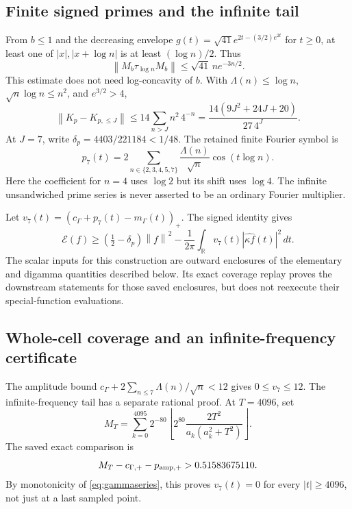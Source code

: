\documentclass[11pt,a4paper]{article}
\numberwithin{equation}{section}
\theoremstyle{definition}\newtheorem{definition}[theorem]{Definition}
\theoremstyle{remark}\newtheorem{remark}[theorem]{Remark}
\newcommand{\EE}{\mathcal E}
\newcommand{\R}{\mathbb R}
\newcommand{\norm}[1]{\left\|#1\right\|}
\begin{document}
\subsection{Finite signed primes and the infinite tail}
From $b\le1$ and the decreasing envelope
$g(t)=\sqrt{41}e^{2t-(3/2)e^{2t}}$ for $t\ge0$, at least one of $|x|,|x+\log n|$ is at least $(\log n)/2$. Thus
\begin{equation}
 \norm{M_b\tau_{\log n}M_b}\le\sqrt{41}\,n e^{-3n/2}.
\end{equation}
This estimate does not need log-concavity of $b$. With $\Lambda(n)\le\log n$, $\sqrt n\log n\le n^2$, and $e^{3/2}>4$,
\begin{equation}\label{eq:primetail}
 \norm{K_p-K_{p,\le J}}\le14\sum_{n>J}n^2\,4^{-n}
 =\frac{14(9J^2+24J+20)}{27\,4^J}.
\end{equation}
At $J=7$, write $\delta_p=4403/221184<1/48$.
The retained finite Fourier symbol is
\begin{equation}\label{eq:p7}
 p_7(t)=2\sum_{n\in\{2,3,4,5,7\}}\frac{\Lambda(n)}{\sqrt n}\cos(t\log n).
\end{equation}
Here the coefficient for $n=4$ uses $\log2$ but its shift uses $\log4$. The infinite unsandwiched prime series is never asserted to be an ordinary Fourier multiplier.

Let $v_7(t)=(c_\Gamma+p_7(t)-m_\Gamma(t))_+$. The signed identity gives
\begin{equation}\label{eq:signedenergy}
 \EE(f)\ge(\tfrac12-\delta_p)\norm f^2
 -\frac1{2\pi}\int_{\R}v_7(t)|\widehat{\kappa f}(t)|^2\,dt.
\end{equation}
The scalar inputs for this construction are outward enclosures of the elementary and digamma quantities described below. Its exact coverage replay proves the downstream statements for those saved enclosures, but does not reexecute their special-function evaluations.

\subsection{Whole-cell coverage and an infinite-frequency certificate}
The amplitude bound $c_\Gamma+2\sum_{n\le7}\Lambda(n)/\sqrt n<12$ gives $0\le v_7\le12$. The infinite-frequency tail has a separate rational proof. At $T=4096$, set
\begin{equation}
 M_T=\sum_{k=0}^{4095}2^{-80}\left\lfloor
 2^{80}\frac{2T^2}{a_k(a_k^2+T^2)}\right\rfloor.
\end{equation}
The saved exact comparison is
\begin{equation}
 M_T-c_{\Gamma,+}-p_{{\rm amp},+}>0.51583675110.
\end{equation}
By monotonicity of \eqref{eq:gammaseries}, this proves $v_7(t)=0$ for every $|t|\ge4096$, not just at a last sampled point.
\end{document}

